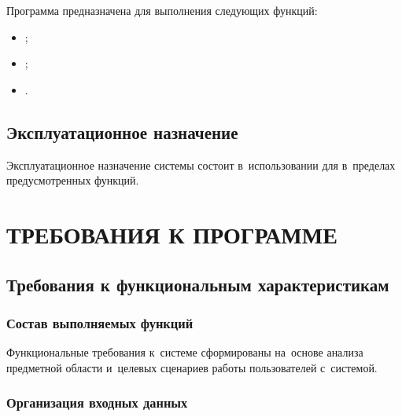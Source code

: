 \documentclass[12pt,a4paper]{extarticle}
\begin{document}
Программа предназначена для выполнения следующих функций:
\begin{itemize}[nosep, leftmargin=1.25cm]
    \item {};
    \item {};
    \item {}.
\end{itemize}

\subsection{Эксплуатационное назначение}

Эксплуатационное назначение системы состоит в~использовании  для  в~пределах предусмотренных функций.

\clearpage

\section{ТРЕБОВАНИЯ К ПРОГРАММЕ}

\subsection{Требования к функциональным характеристикам}
\label{sec:functional_reqs}

\subsubsection{Состав выполняемых функций}



\clearpage

Функциональные требования к~системе сформированы на~основе анализа предметной области и~целевых сценариев работы пользователей с~системой.

\subsubsection{Организация входных данных}
\label{sec:input_data}
\end{document}
